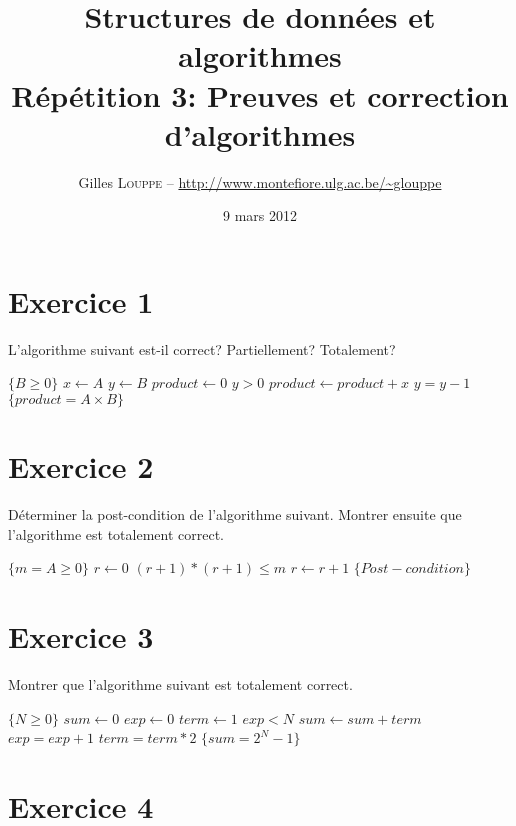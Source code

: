 \documentclass[a4paper,10pt]{article}
\title{
    \textbf{Structures de données et algorithmes}\\
    Répétition 3: Preuves et correction d'algorithmes
}
\author{Gilles \textsc{Louppe} -- \url{http://www.montefiore.ulg.ac.be/~glouppe}}
\date{9 mars 2012}
\begin{document}
\maketitle

\section*{Exercice 1}

L'algorithme suivant est-il correct? Partiellement? Totalement?

\begin{codebox}
    \li \Comment $\{B \geq 0\}$
    \li $x\gets A$
    \li $y\gets B$
    \li $product\gets 0$
    \li \While $y > 0$
    \li \Do     $product\gets product + x$
    \li         $y = y - 1$
        \End
    \li \Comment $\{product = A \times B\}$
    \End
\end{codebox}
\vspace{10pt}

\section*{Exercice 2}

Déterminer la post-condition de l'algorithme suivant. Montrer ensuite que l'algorithme est totalement correct.

\begin{codebox}
    \li \Comment $\{m = A \geq 0\}$
    \li $r\gets 0$
    \li \While $(r+1)*(r+1)\leq m$
    \li \Do     $r\gets r+1$
        \End
    \li \Comment $\{Post-condition\}$
    \End
\end{codebox}
\vspace{10pt}

\section*{Exercice 3}

Montrer que l'algorithme suivant est totalement correct.

\begin{codebox}
    \li \Comment $\{N\geq 0\}$
    \li $sum\gets 0$
    \li $exp\gets 0$
    \li $term\gets 1$
    \li \While $exp < N$
    \li \Do     $sum\gets sum + term$
    \li         $exp = exp + 1$
    \li         $term = term*2$
        \End
    \li \Comment $\{sum = 2^N - 1\}$
\end{codebox}
\vspace{10pt}


\pagebreak
\section*{Exercice 4}
\end{document}
